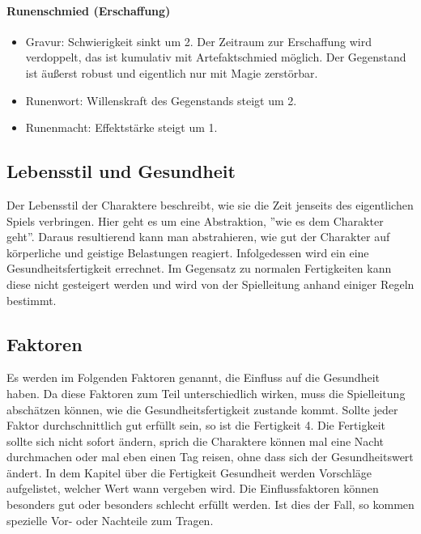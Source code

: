 \documentclass{article}
\begin{document}
\paragraph{Runenschmied (Erschaffung)}

\begin{itemize}
\item Gravur: Schwierigkeit sinkt um 2. Der Zeitraum zur Erschaffung wird verdoppelt, das ist kumulativ mit Artefaktschmied möglich. Der Gegenstand ist äußerst robust und eigentlich nur mit Magie zerstörbar.
\item Runenwort: Willenskraft des Gegenstands steigt um 2.
\item Runenmacht: Effektstärke steigt um 1.
\end{itemize}

\begin{center}
\section{Lebensstil und Gesundheit}
\end{center}

Der Lebensstil der Charaktere beschreibt, wie sie die Zeit jenseits des eigentlichen Spiels verbringen. Hier geht es um
eine Abstraktion, ''wie es dem Charakter geht''. Daraus resultierend kann man abstrahieren, wie gut der Charakter auf
körperliche und geistige Belastungen reagiert. Infolgedessen wird ein eine Gesundheitsfertigkeit errechnet. Im Gegensatz
zu normalen Fertigkeiten kann diese nicht gesteigert werden und wird von der Spielleitung anhand einiger Regeln bestimmt.

\begin{center}
\subsection{Faktoren}
\end{center}

Es werden im Folgenden Faktoren genannt, die Einfluss auf die Gesundheit haben. Da diese Faktoren zum Teil
unterschiedlich wirken, muss die Spielleitung abschätzen können, wie die Gesundheitsfertigkeit zustande kommt. Sollte
jeder Faktor durchschnittlich gut erfüllt sein, so ist die Fertigkeit 4. Die Fertigkeit sollte sich nicht sofort ändern,
sprich die Charaktere können mal eine Nacht durchmachen oder mal eben einen Tag reisen, ohne dass sich der Gesundheitswert
ändert. In dem Kapitel über die Fertigkeit Gesundheit werden Vorschläge aufgelistet, welcher Wert wann vergeben wird.
Die Einflussfaktoren können besonders gut oder besonders schlecht erfüllt werden. Ist dies der Fall, so kommen spezielle
Vor- oder Nachteile zum Tragen.
\end{document}
